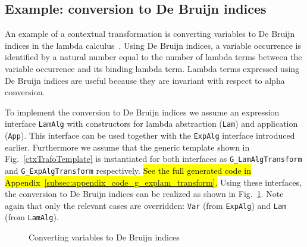 \subsection{Example: conversion to De Bruijn indices}

An example of a contextual transformation is converting variables to De Bruijn indices in the lambda calculus~\cite{deBruijn1972381}.
Using De Bruijn indices, a variable occurrence is identified by a natural number equal to the number of lambda terms between the variable occurrence and its binding lambda term.
Lambda terms expressed using De Bruijn indices are useful because they are invariant with respect to alpha conversion.

To implement the conversion to De Bruijn indices we assume an expression interface \lstinline{LamAlg} with constructors for lambda abstraction (\lstinline{Lam}) and application (\lstinline{App}).
This interface can be used together with the \lstinline{ExpAlg} interface introduced earlier.
Furthermore we assume that the generic template shown in Fig.~\ref{ctxTrafoTemplate} is instantiated for both interfaces as \lstinline{G_LamAlgTransform} and \lstinline{G_ExpAlgTransform} respectively. \hl{See the full generated code in Appendix~\ref{subsec:appendix_code_g_explam_transform}.} 
Using these interfaces, the conversion to De Bruijn indices can be realized as shown in Fig.~\ref{DeBruijn}.
Note again that only the relevant cases are overridden: \lstinline{Var} (from \lstinline{ExpAlg}) and \lstinline{Lam} (from \lstinline{LamAlg}).


\begin{figure}[t]
\nocaptionrule
\caption{Converting variables to De Bruijn indices }
\label{DeBruijn}
\end{figure}




